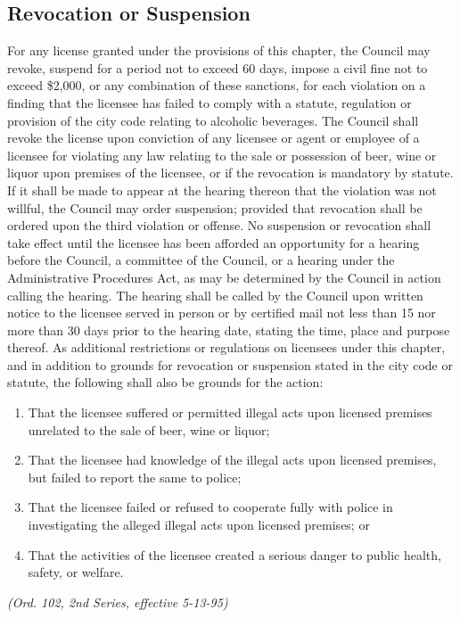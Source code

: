 \subsection{Revocation or Suspension}
For any license granted under the provisions of this chapter, the Council may revoke, suspend for a period not to exceed 60 days, impose a civil fine not to exceed \$2,000, or any combination of these sanctions, for each violation on a finding that the licensee has failed to comply with a statute, regulation or provision of the city code relating to alcoholic beverages. The Council shall revoke the license upon conviction of any licensee or agent or employee of a licensee for violating any law relating to the sale or possession of beer, wine or liquor upon premises of the licensee, or if the revocation is mandatory by statute. If it shall be made to appear at the hearing thereon that the violation was not willful, the Council may order suspension; provided that revocation shall be ordered upon the third violation or offense. No suspension or revocation shall take effect until the licensee has been afforded an opportunity for a hearing before the Council, a committee of the Council, or a hearing under the Administrative Procedures Act, as may be determined by the Council in action calling the hearing. The hearing shall be called by the Council upon written notice to the licensee served in person or by certified mail not less than 15 nor more than 30 days prior to the hearing date, stating the time, place and purpose thereof. As additional restrictions or regulations on licensees under this chapter, and in addition to grounds for revocation or suspension stated in the city code or statute, the following shall also be grounds for the action:
\begin{enumerate}[{\indent}1)]
    \item That the licensee suffered or permitted illegal acts upon licensed premises unrelated to the sale of beer, wine or liquor; 
    \item That the licensee had knowledge of the illegal acts upon licensed premises, but failed to report the same to police; 
    \item That the licensee failed or refused to cooperate fully with police in investigating the alleged illegal acts upon licensed premises; or
    \item That the activities of the licensee created a serious danger to public health, safety, or welfare.
\end{enumerate}
\emph{(Ord. 102, 2nd Series, effective 5-13-95)}
